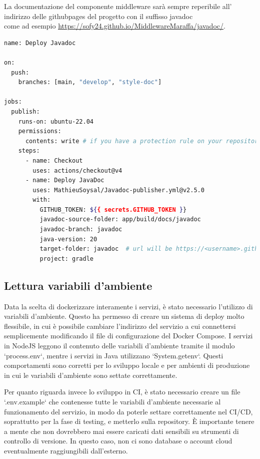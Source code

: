 La documentazione del componente middleware sarà sempre reperibile
all' indirizzo delle githubpages del progetto con il suffisso javadoc \\ come ad esempio \href{https://sofy24.github.io/MiddlewareMaraffa/javadoc/}{\underline{https://sofy24.github.io/MiddlewareMaraffa/javadoc/}}.

\begin{lstlisting}[language=Bash, caption={Configurazione della GitHub Action per il Javadoc}, label=list:javadoc_action]
name: Deploy Javadoc

on:
  push:
    branches: [main, "develop", "style-doc"]

jobs:
  publish:
    runs-on: ubuntu-22.04
    permissions:
      contents: write # if you have a protection rule on your repository, you'll need to give write permission to the workflow.
    steps:
      - name: Checkout
        uses: actions/checkout@v4
      - name: Deploy JavaDoc
        uses: MathieuSoysal/Javadoc-publisher.yml@v2.5.0
        with:
          GITHUB_TOKEN: ${{ secrets.GITHUB_TOKEN }}
          javadoc-source-folder: app/build/docs/javadoc
          javadoc-branch: javadoc
          java-version: 20
          target-folder: javadoc  # url will be https://<username>.github.io/<repo>/javadoc, This can be left as nothing to generate javadocs in the root folder.
          project: gradle
\end{lstlisting}

\subsection{Lettura variabili d'ambiente}

Data la scelta di dockerizzare interamente i servizi, è stato necessario l'utilizzo di variabili d'ambiente. Questo ha permesso di creare un sistema di deploy molto flessibile, in cui è possibile cambiare l'indirizzo del servizio a cui connettersi semplicemente modificando il file di configurazione del Docker Compose. I servizi in NodeJS leggono il contenuto delle variabili d'ambiente tramite il modulo `process.env`, mentre i servizi in Java utilizzano `System.getenv`. Questi comportamenti sono corretti per lo sviluppo locale e per ambienti di produzione in cui le variabili d'ambiente sono settate correttamente.

Per quanto riguarda invece lo sviluppo in CI, è stato necessario creare un file `.env.example` che contenesse tutte le variabili d'ambiente necessarie al funzionamento del servizio, in modo da poterle settare correttamente nel CI/CD, soprattutto per la fase di testing, e metterlo sulla repository. È importante tenere a mente che non dovrebbero mai essere caricati dati sensibili su strumenti di controllo di versione. In questo caso, non ci sono database o account cloud eventualmente raggiungibili dall'esterno.

